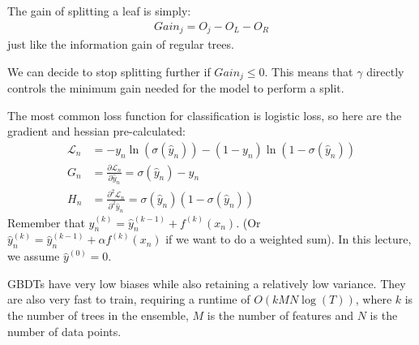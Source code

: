 \documentclass{report}
\newcommand{\pd}[2]{\frac{\partial #1}{\partial #2}}
\newcommand*{\newpar}{\par\vspace{\baselineskip}\noindent}
\newcommand{\loss}{\mathcal{L}}
\newcommand{\yhat}{\hat{y}}
\begin{document}
\newpar
The gain of splitting a leaf is simply:
\begin{align}
 Gain_j = O_j - O_L - O_R
\end{align}
just like the information gain of regular trees.
\newpar
We can decide to stop splitting further if $Gain_j \leq 0$. This means that $\gamma$ directly controls the minimum gain needed for the model to perform a split.
\newpar
The most common loss function for classification is logistic loss, so here are the gradient and hessian pre-calculated:
\begin{align}
 \loss_n &= -y_n \ln(\sigma(\yhat_n)) - (1-y_n)\ln(1-\sigma(\yhat_n))\\
 G_n &= \pd{\loss_n}{\yhat_n} = \sigma(\yhat_n) - y_n\\
 H_n &= \pd{^2 \loss_n}{^2\yhat_n} = \sigma(\yhat_n)(1 - \sigma(\yhat_n))
\end{align}
Remember that $\yhat_n^{(k)} = \yhat_n^{(k-1)} + f^{(k)}(x_n)$. (Or $\yhat_n^{(k)} = \yhat_n^{(k-1)} + \alpha f^{(k)}(x_n)$ if we want to do a weighted sum). In this lecture, we assume $\yhat^{(0)} = 0$.
\newpar
GBDTs have very low biases while also retaining a relatively low variance. They are also very fast to train, requiring a runtime of $O(kMN \log(T))$, where $k$ is the number of trees in the ensemble, $M$ is the number of features and $N$ is the number of data points.
\end{document}
